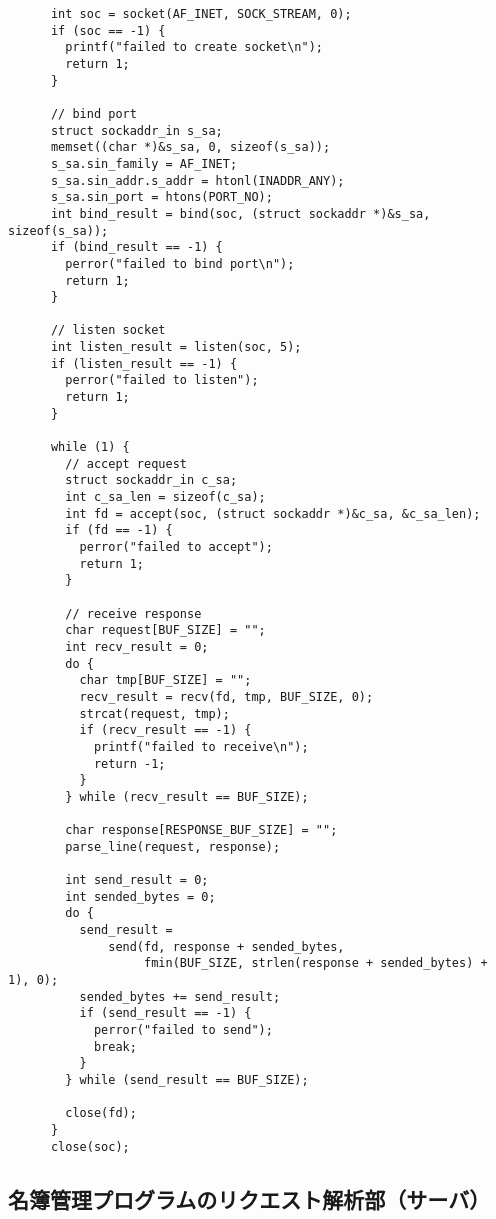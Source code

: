 \documentclass[11pt]{jsarticle}
\begin{document}
\begin{verbatim}
      int soc = socket(AF_INET, SOCK_STREAM, 0);
      if (soc == -1) {
        printf("failed to create socket\n");
        return 1;
      }
    
      // bind port
      struct sockaddr_in s_sa;
      memset((char *)&s_sa, 0, sizeof(s_sa));
      s_sa.sin_family = AF_INET;
      s_sa.sin_addr.s_addr = htonl(INADDR_ANY);
      s_sa.sin_port = htons(PORT_NO);
      int bind_result = bind(soc, (struct sockaddr *)&s_sa, sizeof(s_sa));
      if (bind_result == -1) {
        perror("failed to bind port\n");
        return 1;
      }
    
      // listen socket
      int listen_result = listen(soc, 5);
      if (listen_result == -1) {
        perror("failed to listen");
        return 1;
      }
    
      while (1) {
        // accept request
        struct sockaddr_in c_sa;
        int c_sa_len = sizeof(c_sa);
        int fd = accept(soc, (struct sockaddr *)&c_sa, &c_sa_len);
        if (fd == -1) {
          perror("failed to accept");
          return 1;
        }
    
        // receive response
        char request[BUF_SIZE] = "";
        int recv_result = 0;
        do {
          char tmp[BUF_SIZE] = "";
          recv_result = recv(fd, tmp, BUF_SIZE, 0);
          strcat(request, tmp);
          if (recv_result == -1) {
            printf("failed to receive\n");
            return -1;
          }
        } while (recv_result == BUF_SIZE);
    
        char response[RESPONSE_BUF_SIZE] = "";
        parse_line(request, response);
    
        int send_result = 0;
        int sended_bytes = 0;
        do {
          send_result =
              send(fd, response + sended_bytes,
                   fmin(BUF_SIZE, strlen(response + sended_bytes) + 1), 0);
          sended_bytes += send_result;
          if (send_result == -1) {
            perror("failed to send");
            break;
          }
        } while (send_result == BUF_SIZE);
    
        close(fd);
      }
      close(soc);
\end{verbatim}

\subsection{名簿管理プログラムのリクエスト解析部（サーバ）} \label{sec:parse_request.c}
\end{document}
